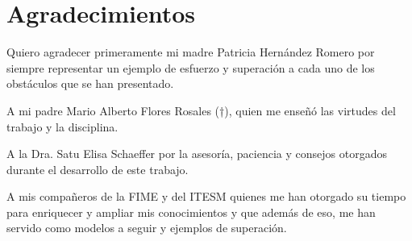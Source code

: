 
\chapter{Agradecimientos}

Quiero agradecer primeramente mi madre Patricia Hernández Romero por siempre representar un ejemplo de esfuerzo y superación a cada uno de los obstáculos que se han presentado.

A mi padre Mario Alberto Flores Rosales (†), quien me enseñó las virtudes del trabajo y la disciplina.


A la Dra. Satu Elisa Schaeffer por la asesoría, paciencia y consejos otorgados durante el desarrollo de este trabajo.

A mis compañeros de la FIME y del ITESM quienes me han otorgado su tiempo para enriquecer y ampliar mis conocimientos y que además de eso, me han servido como modelos a seguir y ejemplos de superación.
